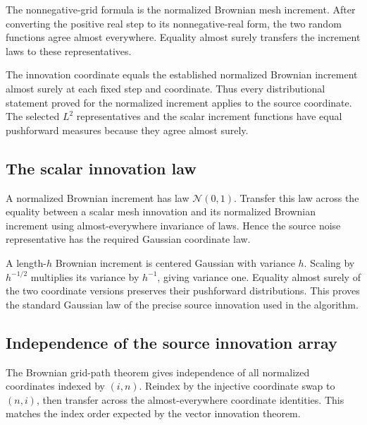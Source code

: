 \documentclass[11pt,a4paper]{report}
\begin{document}
The nonnegative-grid formula is the normalized Brownian mesh increment. After converting the positive real step to its nonnegative-real form, the two random functions agree almost everywhere. Equality almost surely transfers the increment laws to these representatives.



The innovation coordinate equals the established normalized Brownian increment almost surely at each fixed step and coordinate. Thus every distributional statement proved for the normalized increment applies to the source coordinate. The selected \(L^2\) representatives and the scalar increment functions have equal pushforward measures because they agree almost surely.

\subsection{\texorpdfstring{The scalar innovation law}{The scalar innovation law}}
\label{report-step-UnadjustedLangevin-ProductBrownian-lean-10}


A normalized Brownian increment has law \(\mathcal N(0,1)\). Transfer this law across the equality between a scalar mesh innovation and its normalized Brownian increment using almost-everywhere invariance of laws. Hence the source noise representative has the required Gaussian coordinate law.



A length-\(h\) Brownian increment is centered Gaussian with variance \(h\). Scaling by \(h^{-1/2}\) multiplies its variance by \(h^{-1}\), giving variance one. Equality almost surely of the two coordinate versions preserves their pushforward distributions. This proves the standard Gaussian law of the precise source innovation used in the algorithm.

\subsection{\texorpdfstring{Independence of the source innovation array}{Independence of the source innovation array}}
\label{report-step-UnadjustedLangevin-ProductBrownian-lean-11}


The Brownian grid-path theorem gives independence of all normalized coordinates indexed by \((i,n)\). Reindex by the injective coordinate swap to \((n,i)\), then transfer across the almost-everywhere coordinate identities. This matches the index order expected by the vector innovation theorem.
\end{document}
